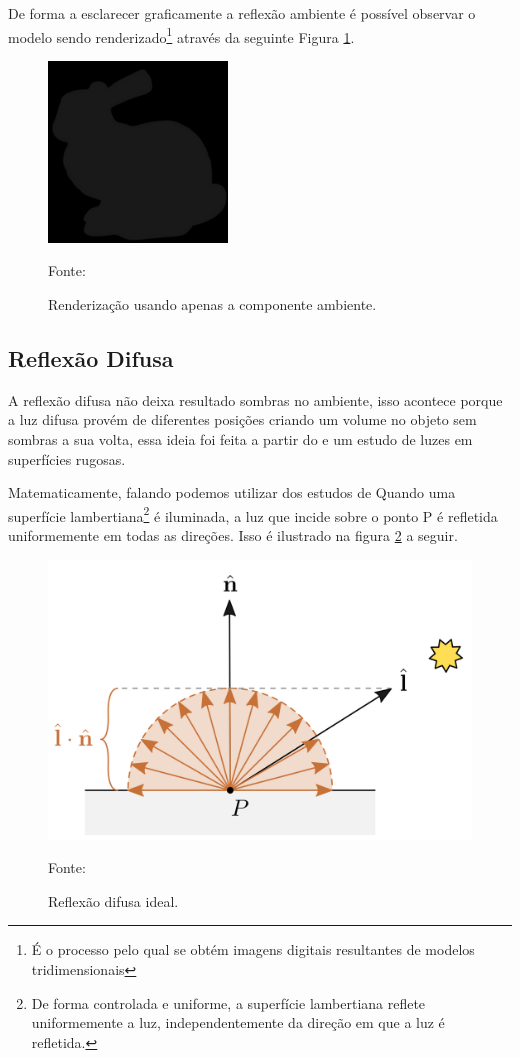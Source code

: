 De forma a esclarecer graficamente a reflexão ambiente é possível observar o modelo sendo renderizado\footnote{É o processo pelo qual se obtém imagens digitais resultantes de modelos tridimensionais} através da seguinte Figura \ref{fig:luz-ambiente}.

\begin{figure}[ht]
	\caption{Renderização usando apenas a componente ambiente.}
	\centering
	\includegraphics[scale=0.5]{imagens/09_lighting11.png}

	Fonte: \cite{Harlen_Batagelo2021}
	\label{fig:luz-ambiente}
\end{figure}


\subsection{Reflexão Difusa}

A reflexão difusa não deixa resultado sombras no ambiente, isso acontece porque a luz difusa provém de diferentes posições criando um volume no objeto sem sombras a sua volta, essa ideia foi feita a partir do  e um estudo de luzes em superfícies rugosas.

Matematicamente, falando podemos utilizar dos estudos de \cite{SteveMarschner584} Quando uma superfície lambertiana\footnote{De forma controlada e uniforme, a superfície lambertiana reflete uniformemente a luz, independentemente da direção em que a luz é refletida. } é iluminada, a luz que incide sobre o ponto P é refletida uniformemente em todas as direções.  Isso é ilustrado na figura \ref{fig:reflexão difusa} a seguir.

\begin{figure}[ht]
	\caption{Reflexão difusa ideal.}
	\centering
	\includegraphics[scale=0.8]{imagens/09_lighting9.png}

	Fonte: \cite{Harlen_Batagelo2021}
	\label{fig:reflexão difusa}
\end{figure}

